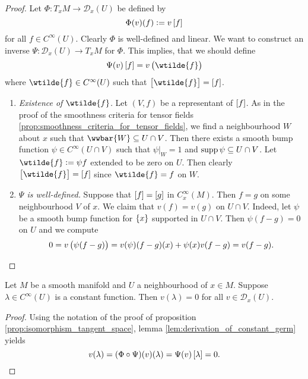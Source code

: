 \begin{proof}
	Let $\Phi : T_xM \to \mathcal{D}_x(U)$ be defined by
	\begin{equation*}
		\Phi(v)(f) := v\sbr[0]{f}
	\end{equation*}
	\noindent for all $f \in C^\infty(U)$. Clearly $\Phi$ is well-defined and linear. We want to construct an inverse $\Psi : \mathcal{D}_x(U) \to T_xM$ for $\Phi$. This implies, that we should define
	\begin{equation*}
		\Psi(v)\sbr[0]{f} = v\del[1]{\wtilde{f}}
	\end{equation*}
	\noindent where $\wtilde{f} \in C^\infty(U)$ such that $\sbr[1]{\wtilde{f}} = \sbr[0]{f}$. 
	\begin{enumerate}[label=\textit{Step \arabic*:},leftmargin=*,wide=0pt]
		\item \textit{Existence of $\wtilde{f}$.} Let $(V,f)$ be a representant of $\sbr[0]{f}$. As in the proof of the smoothness criteria for tensor fields \ref{prop:smoothness_criteria_for_tensor_fields}, we find a neighbourhood $W$ about $x$ such that $\wwbar{W} \subseteq U \cap V$. Then there exists a smooth bump function $\psi \in C^\infty(U \cap V)$ such that $\psi\vert_W = 1$ and $\operatorname{supp} \psi \subseteq U\cap V$. Let $\wtilde{f} := \psi f$ extended to be zero on $U$. Then clearly $\sbr[1]{\wtilde{f}} = \sbr[0]{f}$ since $\wtilde{f} = f$ on $W$.
		\item \textit{$\Psi$ is well-defined.} Suppose that $\sbr[0]{f} = \sbr[0]{g}$ in $C_x^\infty(M)$. Then $f = g$ on some neighbourhood $V$ of $x$. We claim that $v(f) = v(g)$ on $U \cap V$. Indeed, let $\psi$ be a smooth bump function for $\cbr{x}$ supported in $U \cap V$. Then $\psi(f - g) = 0$ on $U$ and we compute
			\begin{equation*}
				0 = v\del[1]{\psi(f - g)} = v(\psi)(f - g)(x) + \psi(x)v(f - g) = v(f - g).
			\end{equation*}
	\end{enumerate}
\end{proof}

\begin{lemma}
	\label{lem:derivation_of_constant_function}
	Let $M$ be a smooth manifold and $U$ a neighbourhood of $x \in M$. Suppose $\lambda \in C^\infty(U)$ is a constant function. Then $v(\lambda) = 0$ for all $v \in \mathcal{D}_x(U)$.
\end{lemma}

\begin{proof}
	Using the notation of the proof of proposition \ref{prop:isomorphism_tangent_space}, lemma \ref{lem:derivation_of_constant_germ} yields	
	\begin{equation*}
		v(\lambda) = (\Phi \circ \Psi)(v)(\lambda) = \Psi(v)\sbr{\lambda} = 0.
	\end{equation*}
\end{proof}

